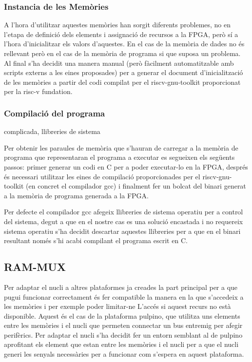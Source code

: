\documentclass[conference,onecolumn, catalan]{IEEEtran}
\begin{document}
\subsubsection{Instancia de les Memòries}

A l'hora d'utilitzar aquestes memòries han sorgit diferents problemes, no en l'etapa de definició dels elements i assignació de recursos a la FPGA, però sí a l'hora d'inicialitzar els valors d'aquestes. En el cas de la memòria de dades no és rellevant però en el cas de la memòria de programa si que suposa un problema. Al final s'ha decidit una manera manual (però fàcilment automatitzable amb scripts externs a les eines proposades) per a generar el document d'inicialització de les memòries a partir del codi compilat per el riscv-gnu-toolkit proporcionat per la risc-v fundation.

\subsubsection{Compilació del programa} complicada, llibreries de sistema

Per obtenir les paraules de memòria que s'hauran de carregar a la memòria de programa que representaran el programa a executar es segueixen els següents passos: primer generar un codi en C per a poder executar-lo en la FPGA, després és necessari utilitzar les eines de compilació proporcionades per el riscv-gnu-toolkit (en concret el compilador gcc) i finalment fer un bolcat del binari generat a la memòria de programa generada a la FPGA. 

Per defecte el compilador gcc afegeix llibreries de sistema operatiu per a control del sistema, degut a que en el nostre cas es una solució encastada i no requereix sistema operatiu s'ha decidit descartar aquestes llibreries per a que en el binari resultant només s'hi acabi compilant el programa escrit en C.

\subsection{RAM-MUX}

Per adaptar el nucli a altres plataformes ja creades la part principal per a que pugui funcionar correctament és fer compatible la manera en la que s'accedeix a les memòries i per exemple poder limitar-ne L'accés si aquest recurs no està disponible. Aquest és el cas de la plataforma pulpino, que utilitza uns elements entre les memòries i el nucli que permeten connectar un bus entremig per afegir perifèrics. Per adaptar el nucli s'ha decidit fer un entorn semblant al de pulpino aprofitant els element que estan entre les memòries i el nucli per a que el nucli generi les senyals necessàries per a funcionar com s'espera en aquest plataforma.
\end{document}
